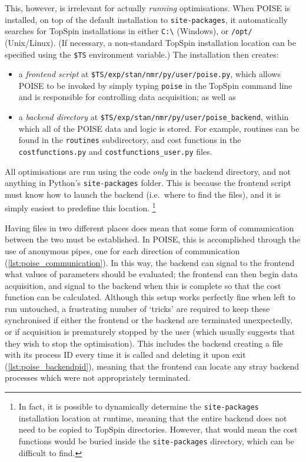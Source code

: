 This, however, is irrelevant for actually \textit{running} optimisations.
When POISE is installed, on top of the default installation to \texttt{site-packages}, it automatically searches for TopSpin installations in either \texttt{C:\textbackslash} (Windows), or \texttt{/opt/} (Unix/Linux).
(If necessary, a non-standard TopSpin installation location can be specified using the \texttt{\$TS} environment variable.)
The installation then creates:
\begin{itemize}
    \item a \textit{frontend script} at \texttt{\$TS/exp/stan/nmr/py/user/poise.py}, which allows POISE to be invoked by simply typing \texttt{poise} in the TopSpin command line and is responsible for controlling data acquisition; as well as
    \item a \textit{backend directory} at \texttt{\$TS/exp/stan/nmr/py/user/poise\_backend}, within which all of the POISE data and logic is stored.
        For example, routines can be found in the \texttt{routines} subdirectory, and cost functions in the \texttt{costfunctions.py} and \texttt{costfunctions\_user.py} files.
\end{itemize}
All optimisations are run using the code \textit{only} in the backend directory, and not anything in Python's \texttt{site-packages} folder.
This is because the frontend script must know how to launch the backend (i.e.\ where to find the files), and it is simply easiest to predefine this location.%
\footnote{In fact, it is possible to dynamically determine the \texttt{site-packages} installation location at runtime, meaning that the entire backend does not need to be copied to TopSpin directories. However, that would mean the cost functions would be buried inside the \texttt{site-packages} directory, which can be difficult to find.}

Having files in two different places does mean that some form of communication between the two must be established.
In POISE, this is accomplished through the use of anonymous pipes, one for each direction of communication (\cref{lst:poise_communication}).
In this way, the backend can signal to the frontend what values of parameters should be evaluated; the frontend can then begin data acquisition, and signal to the backend when this is complete so that the cost function can be calculated.
Although this setup works perfectly fine when left to run untouched, a frustrating number of `tricks' are required to keep these synchronised if either the frontend or the backend are terminated unexpectedly, or if acquisition is prematurely stopped by the user (which usually suggests that they wish to stop the optimisation).
This includes the backend creating a file with its process ID every time it is called and deleting it upon exit (\cref{lst:poise_backendpid}), meaning that the frontend can locate any stray backend processes which were not appropriately terminated.

